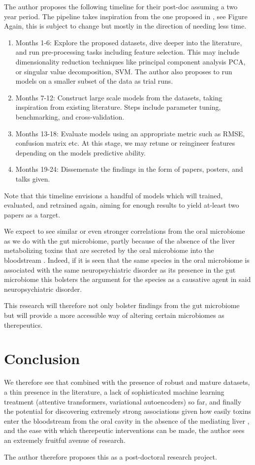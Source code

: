 \documentclass{article}
\begin{document}
\begin{multicols}{2}
The author proposes the following timeline for their post-doc assuming a two year period. The pipeline takes inspiration from the one proposed in \cite{li_machine_2022}, see Figure Again, this is subject to change but mostly in the direction of needing less time. 
\begin{enumerate}[label = \roman*.]
	\item Months 1-6: Explore the proposed datasets, dive deeper into the literature, and run pre-processing tasks including feature selection. This may include dimensionality reduction techniques like principal component analysis PCA, or singular value decomposition, SVM. The author also proposes to run models on a smaller subset of the data as trial runs.
	\item Months 7-12: Construct large scale models from the datasets, taking inspiration from existing literature. Steps include parameter tuning, benchmarking, and cross-validation. 
	\item Months 13-18: Evaluate models using an appropriate metric such as RMSE, confusion matrix etc. At this stage, we may retune or reingineer features depending on the models predictive ability.
	\item Months 19-24: Dissemenate the findings in the form of papers, posters, and talks given. 
\end{enumerate}
Note that this timeline envisions a handful of models which will trained, evaluated, and retrained again, aiming for enough results to yield at-least two papers as a target.

We expect to see similar or even stronger correlations from the oral microbiome as we do with the gut microbiome, partly because of the absence of the liver metabolizing toxins that are secreted by the oral microbiome into the bloodstream \cite{REFISCH2023109568}. Indeed, if it is seen that the same species in the oral microbiome is associated with the same neuropsychiatric disorder as its presence in the gut microbiome this bolsters the argument for the species as a causative agent in said neuropsychiatric disorder.

This research will therefore not only bolster findings from the gut microbiome but will provide a more accessible way of altering certain microbiomes as therepeutics. 
\section{Conclusion}
We therefore see that combined with the presence of robust and mature datasets, a thin presence in the literature, a lack of sophisticated machine learning treatment (attentive transformers, variational autoencoders) so far, and finally the potential for discovering extremely strong associations given how easily toxins enter the bloodstream from the oral cavity in the absence of the mediating liver \cite{REFISCH2023109568}, and the ease with which therepeutic interventions can be made, the author sees an extremely fruitful avenue of research. 

The author therefore proposes this as a post-doctoral research project.



\end{multicols}
\newpage
\end{document}

